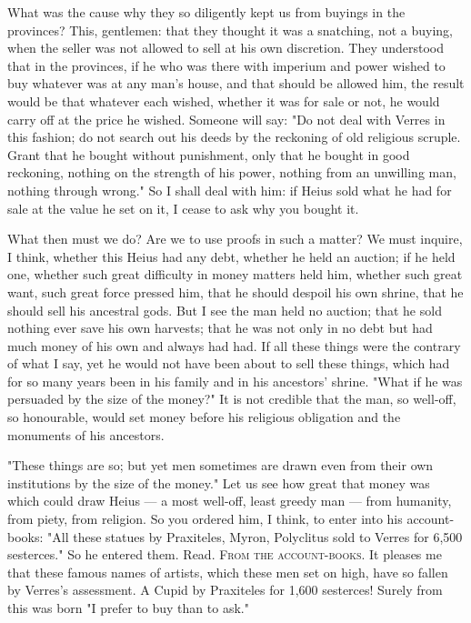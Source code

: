  What was the cause why they so diligently kept us from buyings in the provinces? This, gentlemen: that they thought it was a snatching, not a buying, when the seller was not allowed to sell at his own discretion. They understood that in the provinces, if he who was there with imperium and power wished to buy whatever was at any man's house, and that should be allowed him, the result would be that whatever each wished, whether it was for sale or not, he would carry off at the price he wished. Someone will say: "Do not deal with Verres in this fashion; do not search out his deeds by the reckoning of old religious scruple. Grant that he bought without punishment, only that he bought in good reckoning, nothing on the strength of his power, nothing from an unwilling man, nothing through wrong." So I shall deal with him: if Heius sold what he had for sale at the value he set on it, I cease to ask why you bought it.

 What then must we do? Are we to use proofs in such a matter? We must inquire, I think, whether this Heius had any debt, whether he held an auction; if he held one, whether such great difficulty in money matters held him, whether such great want, such great force pressed him, that he should despoil his own shrine, that he should sell his ancestral gods. But I see the man held no auction; that he sold nothing ever save his own harvests; that he was not only in no debt but had much money of his own and always had had. If all these things were the contrary of what I say, yet he would not have been about to sell these things, which had for so many years been in his family and in his ancestors' shrine. "What if he was persuaded by the size of the money?" It is not credible that the man, so well-off, so honourable, would set money before his religious obligation and the monuments of his ancestors.

 "These things are so; but yet men sometimes are drawn even from their own institutions by the size of the money." Let us see how great that money was which could draw Heius --- a most well-off, least greedy man --- from humanity, from piety, from religion. So you ordered him, I think, to enter into his account-books: "All these statues by Praxiteles, Myron, Polyclitus sold to Verres for 6,500 sesterces." So he entered them. Read. \textsc{From the account-books}. It pleases me that these famous names of artists, which these men set on high, have so fallen by Verres's assessment. A Cupid by Praxiteles for 1,600 sesterces! Surely from this was born "I prefer to buy than to ask."


